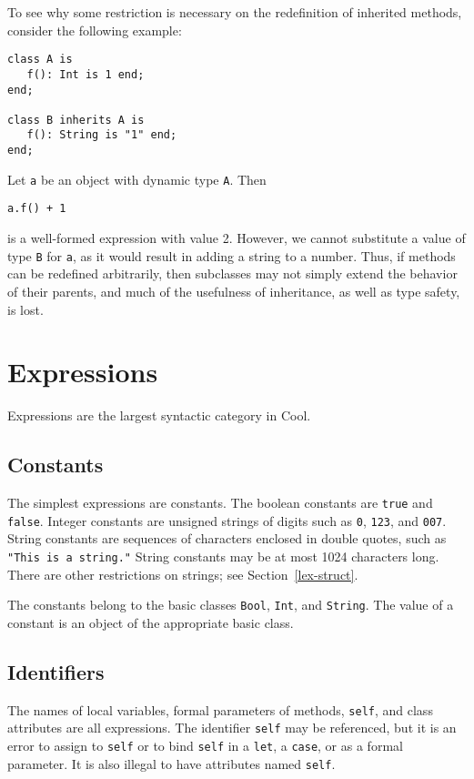 To see why some restriction is necessary on the redefinition of inherited
methods, consider the following example:
\begin{verbatim}
class A is
   f(): Int is 1 end;
end;

class B inherits A is
   f(): String is "1" end;
end;
\end{verbatim}
Let {\tt a} be an object with dynamic type {\tt A}.
Then 
\begin{verbatim}
a.f() + 1
\end{verbatim}
is a well-formed expression with value 2.  However, we cannot
substitute a value of type {\tt B} for {\tt a}, as it would result in
adding a string to a number.  Thus, if methods can be 
redefined arbitrarily, then subclasses may not simply extend the behavior of
their parents, and much of the usefulness of inheritance, as well
as type safety, is lost.

\section{Expressions}
\label{sec-expr}

Expressions are the largest syntactic category in Cool.
\subsection{Constants}

The simplest expressions are constants.  The boolean constants are 
{\tt true} and {\tt false}.  Integer constants are unsigned strings of
digits such as {\tt 0}, {\tt 123}, and {\tt 007}.  String constants 
are sequences of characters enclosed in double quotes, such as
{\tt  "This is a string."}  
String constants may be at most 1024 characters long.  There are
other restrictions on strings; see Section~\ref{lex-struct}.

The constants belong to the basic classes {\tt Bool}, {\tt Int}, and
{\tt String}.
The value of a constant is an object of the appropriate basic class.

\subsection{Identifiers}

The names of local variables, formal parameters of methods,  {\tt self},
and class attributes are all expressions.  The identifier {\tt self} may
be referenced, but it is an error to assign to {\tt self} or to bind
{\tt self} in a {\tt let}, a {\tt case}, or as a formal parameter.
It is also illegal to have attributes named {\tt self}.

